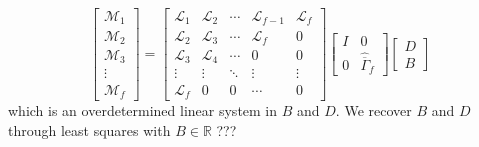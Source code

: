 \begin{equation}
\begin{bmatrix}\mathcal{M}_1\\ \mathcal{M}_2\\ \mathcal{M}_3\\ \vdots\\ \mathcal{M}_f\end{bmatrix} = 
\begin{bmatrix}
\mathcal{L}_1 & \mathcal{L}_2 & \cdots & \mathcal{L}_{f-1} & \mathcal{L}_f\\
\mathcal{L}_2 & \mathcal{L}_3 & \cdots & \mathcal{L}_{f} & 0\\
\mathcal{L}_3 & \mathcal{L}_4 & \cdots & 0 & 0\\
\vdots & \vdots & \ddots & \vdots & \vdots\\
\mathcal{L}_f & 0 & 0 & \cdots & 0
\end{bmatrix}
\begin{bmatrix}I & 0\\ 0 & \hat{\overline{\Gamma}}_f\end{bmatrix}
\begin{bmatrix}D \\ B\end{bmatrix}
\end{equation}
which is an overdetermined linear system in $B$ and $D$. We recover $B$ and $D$ through least squares with $B\in\mathbb{R}$ ???



